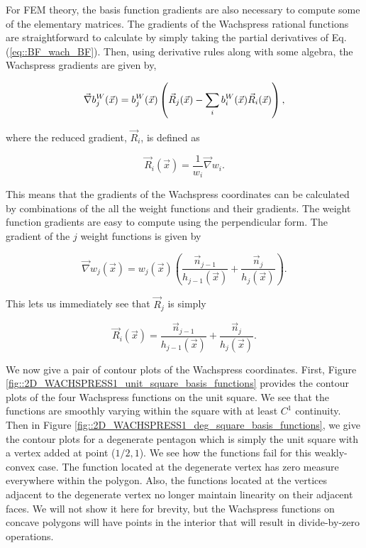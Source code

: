 For FEM theory, the basis function gradients are also necessary to compute some of the elementary matrices. The gradients of the Wachspress rational functions are straightforward to calculate by simply taking the partial derivatives of Eq. (\ref{eq::BF_wach_BF}). Then, using derivative rules along with some algebra, the Wachspress gradients are given by,

\begin{equation}
\label{eq::BF_wach_gradient}
 \vec{\nabla} b_{j}^{W}(\vec{x}) = b_{j}^{W} (\vec{x}) \left( \vec{R}_j  (\vec{x})- \sum\displaylimits_{i}   b_{i}^{W} (\vec{x}) \vec{R}_i (\vec{x}) \right) ,
\end{equation}

\noindent where the reduced gradient, $\vec{R}_i$, is defined as

\begin{equation}
\label{eq::BF_wach_reduced_grad}
\vec{R}_i (\vec{x})  = \frac{1}{w_i} \vec{\nabla} w_i .
\end{equation}

\noindent This means that the gradients of the Wachspress coordinates can be calculated by combinations of the all the weight functions and their gradients. The weight function gradients are easy to compute using the perpendicular form. The gradient of the $j$ weight functions is given by

\begin{equation}
\label{eq::BF_wach_grad_perpdist}
 \vec{\nabla} w_j (\vec{x}) = w_j (\vec{x})  \left(  \frac{\vec{n}_{j-1}}{h_{j-1} (\vec{x})} + \frac{\vec{n}_{j}}{h_{j} (\vec{x})} \right) .
\end{equation}

\noindent This lets us immediately see that $\vec{R}_j$ is simply

\begin{equation}
\label{eq::BF_wach_reduce_grad_form}
\vec{R}_i (\vec{x})  = \frac{\vec{n}_{j-1}}{h_{j-1} (\vec{x})} + \frac{\vec{n}_{j}}{h_{j} (\vec{x})}.
\end{equation}

We now give a pair of contour plots of the Wachspress coordinates. First, Figure \ref{fig::2D_WACHSPRESS1_unit_square_basis_functions} provides the contour plots of the four Wachspress functions on the unit square. We see that the functions are smoothly varying within the square with at least $C^1$ continuity. Then in Figure \ref{fig::2D_WACHSPRESS1_deg_square_basis_functions}, we give the contour plots for a degenerate pentagon which is simply the unit square with a vertex added at point ($1/2,1$). We see how the functions fail for this weakly-convex case. The function located at the degenerate vertex has zero measure everywhere within the polygon. Also, the functions located at the vertices adjacent to the degenerate vertex no longer maintain linearity on their adjacent faces. We will not show it here for brevity, but the Wachspress functions on concave polygons will have points in the interior that will result in divide-by-zero operations.

